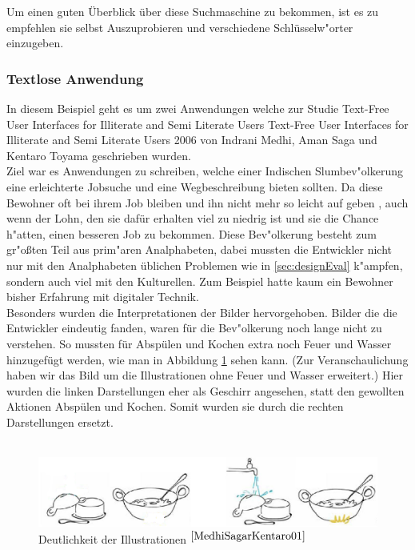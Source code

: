 Um einen guten Überblick über diese Suchmaschine zu bekommen, ist es zu empfehlen sie selbst Auszuprobieren und verschiedene Schlüsselw"orter einzugeben.

\newpage
\subsubsection{Textlose Anwendung}
\label{sec:Studie}
In diesem Beispiel geht es um zwei Anwendungen welche zur Studie \glqq Text-Free User Interfaces for Illiterate and Semi Literate Users \grqq
{}
					{Text-Free User Interfaces for Illiterate and Semi Literate Users}
					{2006}
					{}
 von Indrani Medhi, Aman Saga und Kentaro Toyama geschrieben wurden.\\
Ziel war es Anwendungen zu schreiben, welche einer Indischen Slumbev"olkerung eine erleichterte Jobsuche und eine Wegbeschreibung bieten sollten. Da diese Bewohner oft bei ihrem Job bleiben und ihn nicht mehr so leicht auf geben , auch wenn der Lohn, den sie dafür erhalten viel zu niedrig ist und sie die Chance h"atten, einen besseren Job zu bekommen. Diese Bev"olkerung besteht zum gr"oßten Teil aus prim"aren Analphabeten, dabei mussten die Entwickler nicht nur mit den Analphabeten üblichen Problemen wie in \ref{sec:designEval} k"ampfen, sondern auch viel mit den Kulturellen. Zum Beispiel hatte kaum ein Bewohner bisher Erfahrung mit digitaler Technik.\\
Besonders wurden die Interpretationen der Bilder hervorgehoben. Bilder die die Entwickler eindeutig fanden, waren für die Bev"olkerung noch lange nicht zu verstehen. So mussten für Abspülen und Kochen extra noch Feuer und Wasser hinzugefügt werden, wie man in Abbildung \ref{fig:picfail} sehen kann. (Zur Veranschaulichung haben wir das Bild um die Illustrationen ohne Feuer und Wasser erweitert.) Hier wurden die linken Darstellungen eher als Geschirr angesehen, statt den gewollten Aktionen Abspülen und Kochen. Somit wurden sie durch die rechten Darstellungen ersetzt.\\\\

\begin{figure}[h]
	\centering
		\includegraphics[width=1.00\textwidth]{Daten/pic_fail2.PNG}
	\caption{Deutlichkeit der Illustrationen $^{\ref{MedhiSagarKentaro01}}$}
	\label{fig:picfail}
\end{figure}

